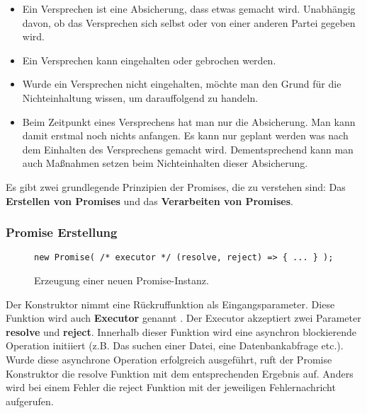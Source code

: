 \begin{itemize}
    \item Ein Versprechen ist eine Absicherung, dass etwas gemacht wird. Unabhängig davon, ob das Versprechen sich selbst oder von einer anderen Partei gegeben wird.
    
    \item Ein Versprechen kann eingehalten oder gebrochen werden.
    
    \item Wurde ein Versprechen nicht eingehalten, möchte man den Grund für die Nichteinhaltung wissen, um darauffolgend zu handeln.
    
    \item Beim Zeitpunkt eines Versprechens hat man nur die Absicherung. Man kann damit erstmal noch nichts anfangen. Es kann nur geplant werden was nach dem Einhalten des Versprechens gemacht wird. Dementsprechend kann man auch Maßnahmen setzen beim Nichteinhalten dieser Absicherung.
    
\end{itemize}

\noindent
Es gibt zwei grundlegende Prinzipien der Promises, die zu verstehen sind: Das \textbf{Erstellen von Promises} und das \textbf{Verarbeiten von Promises}.

\subsubsection{Promise Erstellung}

\begin{figure}[H]
\begin{lstlisting}[basicstyle=\small]
new Promise( /* executor */ (resolve, reject) => { ... } );
\end{lstlisting}
\caption{Erzeugung einer neuen Promise-Instanz.}
\end{figure}

Der Konstruktor nimmt eine Rückruffunktion als Eingangsparameter. Diese Funktion wird auch \textbf{Executor} genannt \cite{promise-executor}. Der Executor akzeptiert zwei Parameter \textbf{resolve} und \textbf{reject}. Innerhalb dieser Funktion wird eine asynchron blockierende Operation initiiert (z.B. Das suchen einer Datei, eine Datenbankabfrage etc.). Wurde diese asynchrone Operation erfolgreich ausgeführt, ruft der Promise Konstruktor die resolve Funktion mit dem entsprechenden Ergebnis auf. Anders wird bei einem Fehler die reject Funktion mit der jeweiligen Fehlernachricht aufgerufen.

